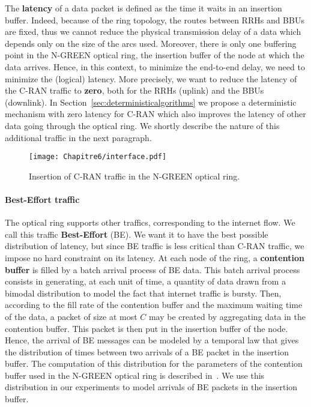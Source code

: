    The {\bf latency} of a data packet is defined as the time it waits in an insertion buffer.
   Indeed, because of the ring topology, the routes between RRHs and BBUs are fixed, thus we cannot reduce the physical transmission delay of a data which depends only on the size of the arcs used. Moreover, there is only one buffering point in the N-GREEN optical ring, the insertion buffer of the node at which the data arrives. Hence, in this context, to minimize the end-to-end delay, we need to minimize the (logical) latency.
   More precisely, we want to reduce the latency of the C-RAN traffic to \textbf{zero}, both for the RRHs (uplink) and the BBUs (downlink). In Section~\ref{sec:deterministicalgorithms} we propose a deterministic mechanism with zero latency for C-RAN which also improves the latency of other data going through the optical ring. We shortly describe the nature of this additional traffic in the next paragraph.
    
\begin{figure}[h!]
\begin{center}  
      \texttt{[image: Chapitre6/interface.pdf]}
     \caption{Insertion of C-RAN traffic in the N-GREEN optical ring.}\label{fig:interface}
\end{center}
  \end{figure}
\vspace{-0.5cm}
\paragraph{Best-Effort traffic}

The optical ring supports other traffics, corresponding to the internet flow. We call this traffic \textbf{Best-Effort} (BE). We want it to have the best possible distribution of latency, but since BE traffic is less critical than C-RAN traffic, we impose no hard constraint on its latency. At each node of the ring, a {\bf contention buffer} is filled by a batch arrival process of BE data. 
This batch arrival process consists in generating, at each unit of time, a quantity of data drawn from a bimodal distribution to model the fact that internet traffic is bursty. Then, according to the fill rate of the contention buffer and the maximum waiting time of the data, a packet of size at most $C$ may be created by aggregating data in the contention buffer. This packet is then put in the insertion buffer of the node. Hence, the arrival of BE messages can be modeled by a temporal law that gives the distribution of times between two arrivals of a BE packet in the insertion buffer. The computation of this distribution for the parameters of the contention buffer used in the N-GREEN optical ring is described in~\cite{Cast1810:Performance}. We use this distribution in our experiments to model arrivals of BE packets in the insertion buffer.

